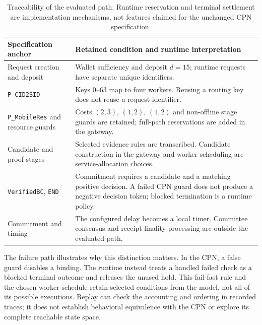 \begin{table}[t]
\caption{Traceability of the evaluated path. Runtime reservation and terminal
settlement are implementation mechanisms, not features claimed for the
unchanged CPN specification.}
\label{tab:traceability}
\centering
\footnotesize
\setlength{\tabcolsep}{3pt}
\renewcommand{\arraystretch}{1.10}

\begin{tabularx}{\columnwidth}{@{}
  >{\raggedright\arraybackslash}p{}
  >{\raggedright\arraybackslash}X@{}}
\toprule
Specification anchor &
Retained condition and runtime interpretation\\
\midrule

Request creation and deposit &
Wallet sufficiency and deposit $d=15$; runtime requests have separate unique
identifiers.\\
\addlinespace[2pt]

\texttt{P\_CID2SID} &
Keys 0--63 map to four workers. Reusing a routing key does not reuse a
request identifier.\\
\addlinespace[2pt]

\texttt{P\_MobileRes} and resource guards &
Costs $(2,3)$, $(1,2)$, $(1,2)$ and non-offline stage guards are retained;
full-path reservations are added in the gateway.\\
\addlinespace[2pt]

Candidate and proof stages &
Selected evidence rules are transcribed. Candidate construction in the
gateway and worker scheduling are service-allocation choices.\\
\addlinespace[2pt]

\texttt{VerifiedBC}, \texttt{END} &
Commitment requires a candidate and a matching positive decision.
A failed CPN guard does not produce a negative decision token;
blocked termination is a runtime policy.\\
\addlinespace[2pt]

Commitment and timing &
The configured delay becomes a local timer. Committee consensus and
receipt-finality processing are outside the evaluated path.\\

\bottomrule
\end{tabularx}
\end{table}

The failure path illustrates why this distinction matters. In the CPN, a
false guard disables a binding. The runtime instead treats a handled failed
check as a blocked terminal outcome and releases the unused hold. This
fail-fast rule and the chosen worker schedule retain selected conditions
from the model, not all of its possible executions. Replay can check the
accounting and ordering in recorded traces; it does not establish behavioral
equivalence with the CPN or explore its complete reachable state space.

